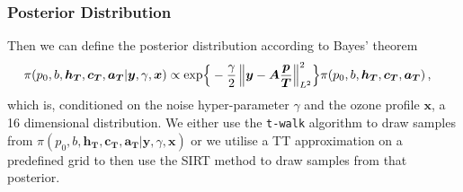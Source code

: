 \subsubsection{Posterior Distribution}
Then we can define the posterior distribution according to Bayes' theorem
\begin{align}
	\pi(p_0,b,\bm{h_T},\bm{c_T},\bm{a_T} | \bm{y}, \gamma, \bm{x}) \propto  \exp\Bigl\{ & -\frac{\gamma}{2} \left\Vert \bm{y}- \bm{A} \frac{\bm{p}}{\bm{T}}  \right\Vert_{L^2}^2 \Bigr\} \pi(p_0,b,\bm{h_T},\bm{c_T},\bm{a_T})\, ,
\end{align}
which is, conditioned on the noise hyper-parameter $\gamma$ and the ozone profile $\bm{x}$, a 16 dimensional distribution.
We either use the \texttt{t-walk} algorithm \cite{christen2010general} to draw samples from $\pi(p_0,b,\bm{h_T},\bm{c_T},\bm{a_T} | \bm{y}, \gamma, \bm{x})$ or we utilise a TT approximation on a predefined grid to then use the SIRT method to draw samples from that posterior.
\clearpage


